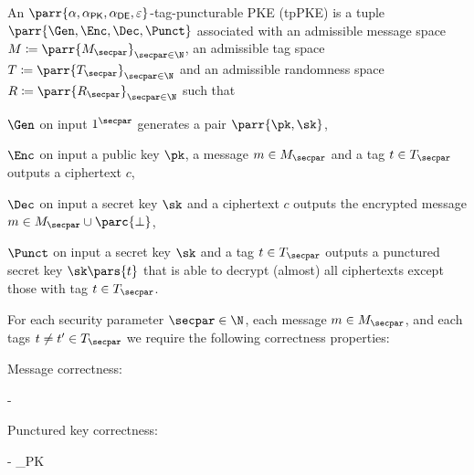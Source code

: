 \begin{definition}
    An \(\parr{\alpha,\alpha_{\textsf{PK}},\alpha_{\textsf{DE}},\varepsilon}\)-tag-puncturable PKE (tpPKE) is a tuple \(\parr{\Gen,\Enc,\Dec,\Punct}\) associated with an admissible message space \(M \coloneqq \parr{M_\secpar}_{\secpar \in \N}\),
    an admissible tag space \(T \coloneqq \parr{T_\secpar}_{\secpar \in \N}\) and
    an admissible randomness space \(R \coloneqq \parr{R_\secpar}_{\secpar \in \N}\) such that
    \begin{sitemize}
        \item \(\Gen\) on input \(1^\secpar\) generates a pair \(\parr{\pk,\sk}\),
        \item \(\Enc\) on input a public key \(\pk\), a message \(m \in M_\secpar\) and a tag \(t \in T_\secpar\) outputs a ciphertext \(c\),
        \item \(\Dec\) on input a secret key \(\sk\) and a ciphertext \(c\) outputs the encrypted message \(m \in M_\secpar \cup \parc{\bot}\),
        \item \(\Punct\) on input a secret key \(\sk\) and a tag \(t \in T_\secpar\) outputs a punctured secret key \(\sk\pars{t}\) that is able to decrypt (almost) all ciphertexts except those with tag \(t \in T_\secpar\).
    \end{sitemize}
    For each security parameter \(\secpar \in \N\),
    each message \(m \in M_\secpar\),
    and each tags \(t \neq t' \in T_\secpar\) we require the following correctness properties:
    \begin{sitemize}
        \item Message correctness:
        \begin{bralign}
             - \alpha\parr{\secpar}
        \end{bralign}

        \item Punctured key correctness:
        \begin{bralign}
             - \alpha_{\textsf{PK}}\parr{\secpar}
        \end{bralign}


\end{sitemize}
\end{definition}
